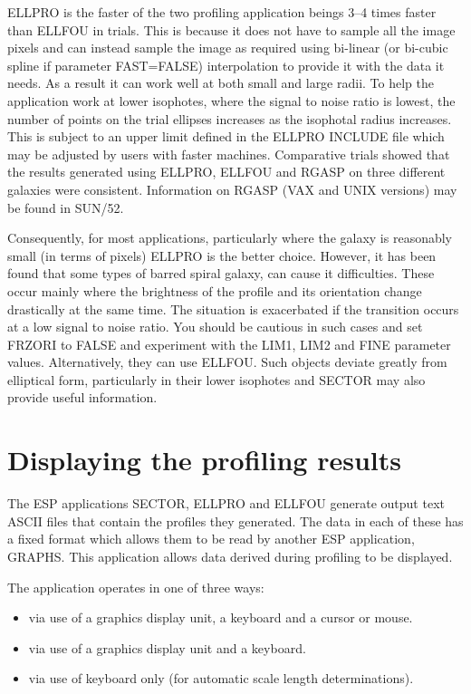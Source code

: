\documentclass[twoside,11pt]{article}
\newcommand{\xref}[3]{#1}
\begin{document}
ELLPRO is the faster of the two profiling application beings 3--4 times 
faster than ELLFOU in trials. This is because it does not have to sample 
all the image pixels and can instead sample the image as required 
using bi-linear (or bi-cubic spline if parameter FAST=FALSE) 
interpolation to provide it with the data it needs. As a result it can work 
well at both small and large radii. To help the application work at lower 
isophotes, where the signal to noise ratio is lowest, the number of  
points on the trial ellipses increases as the isophotal
radius increases. This is subject to an upper limit defined in the ELLPRO 
INCLUDE file which may be adjusted by users with faster machines. 
Comparative trials showed that the results generated using ELLPRO, ELLFOU 
and RGASP on three different galaxies were consistent. Information on
RGASP (VAX and UNIX versions) may be found in \xref{SUN/52}{sun52}{}.

Consequently, for most applications, particularly where the galaxy is 
reasonably small (in terms of pixels) ELLPRO is the better choice. 
However, it has been found that some types of barred spiral galaxy, 
can cause it difficulties. These occur mainly where the brightness of
the profile and its orientation change drastically at the same time. 
The situation is exacerbated if the transition occurs at a low signal to 
noise ratio. You should be cautious in such cases and set FRZORI to FALSE 
and experiment with the LIM1, LIM2 and FINE parameter values. Alternatively,
they can use ELLFOU. Such objects deviate greatly from elliptical form, 
particularly in their lower isophotes and SECTOR may also provide useful 
information.


\section{Displaying the profiling results}
\label{sec:displaying}

The ESP applications SECTOR, ELLPRO and ELLFOU generate output text
ASCII files that contain the profiles they generated. The data in each of these
has a fixed format which allows them to be read by another ESP application,
GRAPHS. This application allows data derived during profiling to be displayed.

The application operates in one of three ways:

\begin{itemize}
\item via use of a graphics display unit, a keyboard and a cursor or mouse.
\item via use of a graphics display unit and a keyboard.
\item via use of keyboard only (for automatic scale length determinations).
\end{itemize}
\end{document}
